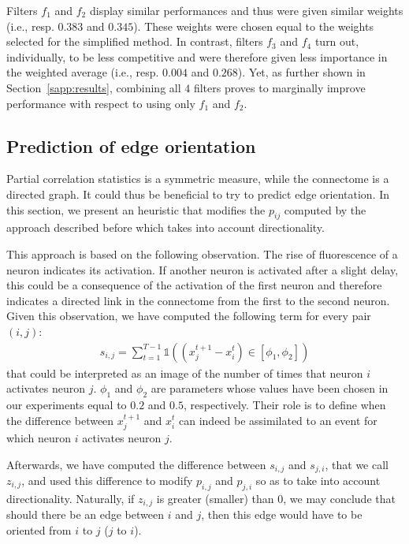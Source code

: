 \documentclass[wcp]{jmlr}
\begin{document}
Filters $f_1$ and $f_2$ display similar performances and thus were given similar
weights (i.e., resp. $0.383$ and $0.345$). These weights were chosen equal to the weights selected for the simplified method. In contrast, filters $f_3$
and $f_4$ turn out, individually, to be less competitive and were therefore given
less importance in the weighted average (i.e., resp. $0.004$ and $0.268$). Yet, as further shown in
Section~\ref{sapp:results}, combining all $4$ filters proves to marginally
improve performance with respect to using only $f_1$ and $f_2$.

\subsection{Prediction of edge orientation}
\label{sapp:connectome}

Partial  correlation  statistics is  a  symmetric  measure, while  the
connectome is a directed graph. It  could thus be beneficial to try to
predict edge orientation. In this section, we present an heuristic that
modifies the  $p_{ij}$ computed  by the  approach described  before which
takes into account directionality.

This approach is based on the following
observation. The rise of fluorescence of a neuron indicates its
activation. If another neuron is activated after a slight delay, this
could be a consequence of the activation of the first neuron and
therefore indicates a directed link in the connectome from the first to
the second neuron.  Given this observation, we have computed the following term for every
pair $(i,j)$:
\begin{align}
s_{i,j} = \sum_{t=1}^{T - 1} \mathbb{1}((x_j^{t+1} - x_i^t) \in \left[\phi_1, \phi_2\right])
\end{align}
that could be interpreted as an image of the  number of times
that neuron $i$ activates neuron $j$. $\phi_1$ and $\phi_2$ are
parameters whose values have been chosen in our experiments equal to
$0.2$ and $0.5$, respectively. Their role is to
define when the difference between $x_j^{t+1}$  and $x_i^t$ can
indeed be assimilated to an event for which neuron $i$ activates neuron
$j$.

Afterwards, we have computed the difference between $s_{i,j}$ and
$s_{j,i}$, that we call $z_{i,j}$, and used this difference to modify  $p_{i,j}$ and
$p_{j,i}$ so as to take into account directionality. Naturally, if
$z_{i,j}$ is greater  (smaller) than $0$, we may conclude that should there  be an
edge between $i$ and $j$, then this edge would have to be oriented
from $i$ to $j$ ($j$ to $i$).
\end{document}
